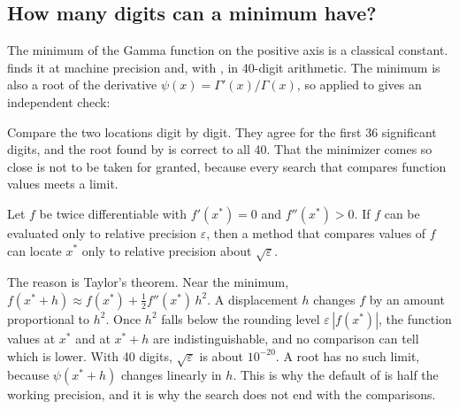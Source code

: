 
\subsection{How many digits can a minimum have?}

The minimum of the Gamma function on the positive axis is a classical
constant.  finds it at machine precision and, with
, in 40-digit arithmetic. The minimum is also a root of
the derivative \(\psi(x) = \Gamma'(x)/\Gamma(x)\), so  applied to
 gives an independent check:

\begin{codepairs}
\end{codepairs}

Compare the two locations digit by digit. They agree for the first 36
significant digits, and the root found by  is correct to all 40. That
the minimizer comes so close is not to be taken for granted, because every search
that compares function values meets a limit.

\begin{theorem}
Let \(f\) be twice differentiable with \(f'(x^*) = 0\) and \(f''(x^*) > 0\).
If \(f\) can be evaluated only to relative precision \(\varepsilon\), then a
method that compares values of \(f\) can locate
\(x^*\) only to relative precision about
\(\sqrt{\varepsilon}\).
\end{theorem}

The reason is Taylor's theorem. Near the minimum,
\(f(x^* + h) \approx f(x^*) + \tfrac12 f''(x^*)\,h^2\). A displacement \(h\)
changes \(f\) by an amount proportional to \(h^2\). Once \(h^2\) falls below the
rounding level \(\varepsilon\,|f(x^*)|\), the function values at \(x^*\) and at
\(x^* + h\) are indistinguishable, and no comparison can tell which is lower. With
40 digits, \(\sqrt{\varepsilon}\) is about \(10^{-20}\). A root has no such limit,
because \(\psi(x^* + h)\) changes linearly in \(h\). This is why the default
 of  is half the working precision, and it is why
the search does not end with the comparisons.

